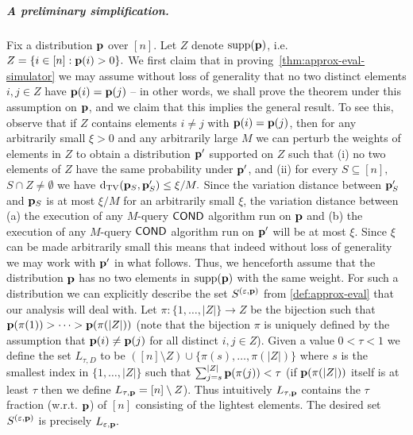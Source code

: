 \subparagraph{A preliminary simplification.}
Fix a distribution $\mathbf{p}$ over $[n]$.  Let $Z$ denote $\operatorname{supp}\!\left(\mathbf{p}\right)$,
i.e. $Z = \{i \in [n]: \mathbf{p}(i) > 0\}.$
We first claim that in proving~\cref{thm:approx-eval-simulator}
we may assume without loss of generality
that no two distinct elements $i, j \in Z$ have $\mathbf{p}(i)=\mathbf{p}(j)$ -- in other
words, we shall prove the theorem under this assumption on $\mathbf{p}$, and
we claim that this implies the general result.
To see this, observe that if $Z$ contains elements $i \neq j$
with $\mathbf{p}(i)=\mathbf{p}(j)$,
then for any arbitrarily
small $\xi>0$ and any arbitrarily large $M$  we can perturb the weights
of elements in $Z$ to obtain a distribution $\mathbf{p}'$ supported on $Z$
such that (i) no two elements of $Z$
have the same probability under $\mathbf{p}'$, and (ii)
for every $S \subseteq [n],$ $S \cap Z \neq \emptyset$
we have $\operatorname{d}_{\rm{TV}}(\mathbf{p}_S,\mathbf{p}'_{S}) \leq \xi/M.$
Since the variation distance between $\mathbf{p}'_S$ and $\mathbf{p}_S$ is
at most $\xi/M$ for an arbitrarily small $\xi$,
the variation distance between (a) the execution of any $M$-query ${\sf COND}$
algorithm run on $\mathbf{p}$ and (b) the execution of any $M$-query ${\sf COND}$
algorithm run on $\mathbf{p}'$ will be at most $\xi.$  Since $\xi$ can be
made arbitrarily small this means that indeed without loss of generality
we may work with $\mathbf{p}'$ in what follows.
Thus, we henceforth assume that the distribution $\mathbf{p}$ has no two elements
in $\operatorname{supp}\!\left(\mathbf{p}\right)$ with the same weight.  For such a distribution
we can explicitly describe the set $S^{(\varepsilon,\mathbf{p})}$ from
\cref{def:approx-eval} that our analysis will deal with.
Let $\pi: \{1,\dots,|Z|\} \to Z$ be the bijection such
that $\mathbf{p}(\pi(1)) > \cdots > \mathbf{p}(\pi(|Z|))$ (note that
the bijection $\pi$ is uniquely defined by the assumption that $\mathbf{p}(i)
\neq \mathbf{p}(j)$ for all distinct $i,j \in Z$).
Given a value $0 < \tau < 1$
we define the set $L_{\tau,D}$ to be $
([n] \setminus Z) \cup \{\pi(s),\dots,\pi(|Z|)\}$ where $s$ is
the smallest index in $\{1,\dots,|Z|\}$
such that $\sum_{j=s}^{|Z|} \mathbf{p}(\pi(j)) < \tau$
(if $\mathbf{p}(\pi(|Z|))$ itself is at least $\tau$ then we define
$L_{\tau,\mathbf{p}} = [n] \setminus Z$).
Thus intuitively $L_{\tau,\mathbf{p}}$ contains the $\tau$
fraction (w.r.t. $\mathbf{p}$) of $[n]$ consisting of the lightest elements.
The desired set $S^{(\varepsilon,\mathbf{p})}$ is precisely $L_{\varepsilon,\mathbf{p}}.$


\medskip


